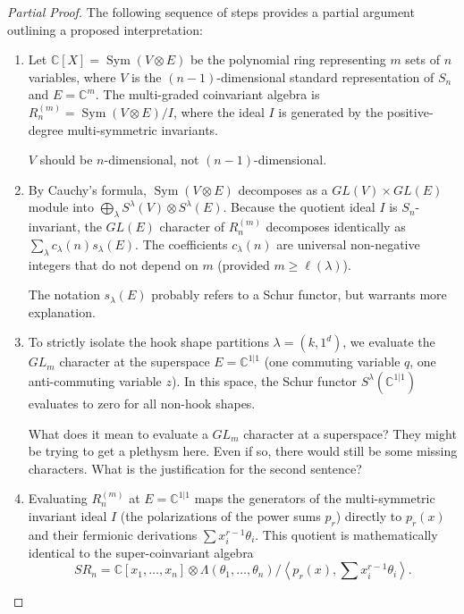 \documentclass[12pt]{article}
\newcommand{\review}[1]{\begin{reviewbox}#1\end{reviewbox}}
\begin{document}
\begin{proof}[Partial Proof]
The following sequence of steps provides a partial argument outlining a proposed interpretation:

\begin{enumerate}
    \item Let $\mathbb{C}[X] = \operatorname{Sym}(V \otimes E)$ be the polynomial ring representing $m$ sets of $n$ variables, where $V$ is the $(n-1)$-dimensional standard representation of $S_n$ and $E = \mathbb{C}^m$. The multi-graded coinvariant algebra is $R_n^{(m)} = \operatorname{Sym}(V \otimes E) / I$, where the ideal $I$ is generated by the positive-degree multi-symmetric invariants.

    \review{$V$ should be $n$-dimensional, not $(n-1)$-dimensional.}
    
    \item By Cauchy's formula, $\operatorname{Sym}(V \otimes E)$ decomposes as a $GL(V) \times GL(E)$ module into $\bigoplus_{\lambda} S^\lambda(V) \otimes S^\lambda(E)$. Because the quotient ideal $I$ is $S_n$-invariant, the $GL(E)$ character of $R_n^{(m)}$ decomposes identically as $\sum_\lambda c_\lambda(n) s_\lambda(E)$. The coefficients $c_\lambda(n)$ are universal non-negative integers that do not depend on $m$ (provided $m \ge \ell(\lambda)$).

    \review{The notation $s_\lambda(E)$ probably refers to a Schur functor, but warrants more explanation.}
    
    \item To strictly isolate the hook shape partitions $\lambda = (k, 1^d)$, we evaluate the $GL_m$ character at the superspace $E = \mathbb{C}^{1|1}$ (one commuting variable $q$, one anti-commuting variable $z$). In this space, the Schur functor $S^\lambda(\mathbb{C}^{1|1})$ evaluates to zero for all non-hook shapes. 

    \review{What does it mean to evaluate a $GL_m$ character at a superspace? They might be trying to get a plethysm here. Even if so, there would still be some missing characters. What is the justification for the second sentence?}
    
    \item Evaluating $R_n^{(m)}$ at $E = \mathbb{C}^{1|1}$ maps the generators of the multi-symmetric invariant ideal $I$ (the polarizations of the power sums $p_r$) directly to $p_r(x)$ and their fermionic derivations $\sum x_i^{r-1} \theta_i$. This quotient is mathematically identical to the super-coinvariant algebra 
    \[
    SR_n = \mathbb{C}[x_1, \dots, x_n] \otimes \Lambda(\theta_1, \dots, \theta_n) / \left\langle p_r(x), \sum x_i^{r-1} \theta_i \right\rangle.
    \]


\end{enumerate}
\end{proof}
\end{document}
